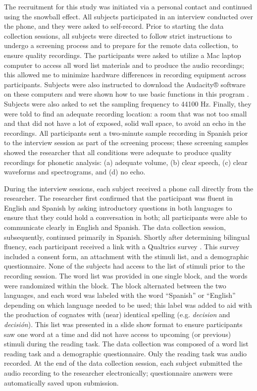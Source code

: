 \documentclass[output=paper,colorlinks,citecolor=brown,
]{langscibook}
\begin{document}
The recruitment for this study was initiated via a personal contact and continued using the snowball effect. All subjects participated in an interview conducted over the phone, and they were asked to self-record. Prior to starting the data collection sessions, all subjects were directed to follow strict instructions to undergo a screening process and to prepare for the remote data collection, to ensure quality recordings. The participants were asked to utilize a Mac laptop computer to access all word list materials and to produce the audio recordings; this allowed me to minimize hardware differences in recording equipment across participants. Subjects were also instructed to download the Audacity® software on these computers and were shown how to use basic functions in this program \citep[e.g. recording, stopping, and saving audio recordings as wav files;][]{audacity}. Subjects were also asked to set the sampling frequency to 44100 Hz. Finally, they were told to find an adequate recording location: a room that was not too small and that did not have a lot of exposed, solid wall space, to avoid an echo in the recordings. All participants sent a two-minute sample recording in Spanish prior to the interview session as part of the screening process; these screening samples showed the researcher that all conditions were adequate to produce quality recordings for phonetic analysis: (a) adequate volume, (b) clear speech, (c) clear waveforms and spectrograms, and (d) no echo.

During the interview sessions, each subject received a phone call directly from the researcher. The researcher first confirmed that the participant was fluent in English and Spanish by asking introductory questions in both languages to ensure that they could hold a conversation in both; all participants were able to communicate clearly in English and Spanish. The data collection session, subsequently, continued primarily in Spanish. Shortly after determining bilingual fluency, each participant received a link with a Qualtrics survey \citep{qualtrics}. This survey included a consent form, an attachment with the stimuli list, and a demographic questionnaire. None of the subjects had access to the list of stimuli prior to the recording session. The word list was provided in one single block, and the words were randomized within the block. The block alternated between the two languages, and each word was labeled with the word ``Spanish'' or ``English'' depending on which language needed to be used; this label was added to aid with the production of cognates with (near) identical spelling (e.g. \textit{decision} and \textit{decisi{\'o}n}). This list was presented in a slide show format to ensure participants saw one word at a time and did not have access to upcoming (or previous) stimuli during the reading task. The data collection was composed of a word list reading task and a demographic questionnaire. Only the reading task was audio recorded. At the end of the data collection session, each subject submitted the audio recording to the researcher electronically; questionnaire answers were automatically saved upon submission.
\end{document}
